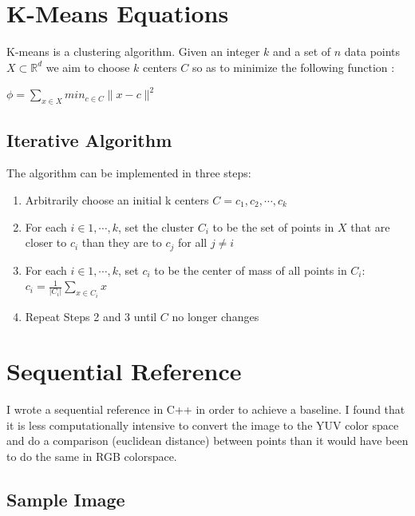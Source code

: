\documentclass[11pt]{article}
\begin{document}
\maketitle

\section{K-Means Equations}

K-means is a clustering algorithm. Given an integer $k$ and a set of $n$ data points $X \subset \mathbb{R}^d$ we aim to choose $k$ centers $C$ so as to minimize the following function \cite{arthur}:
\newline

\begin{math}
\phi = \displaystyle\sum_{x \in X} min_{c \in C }\| x - c \|^2
\end{math}

\subsection{Iterative Algorithm}
The algorithm can be implemented in three steps:

\begin{enumerate}
\item Arbitrarily choose an initial k centers $C = {c_1, c_2, \cdots, c_k}$
\item For each $i \in {1, \cdots, k}$, set the cluster $C_i$ to be the set of points in $X$ that are closer to $c_i$ than they are to $c_j$ for all $j \neq i$
\item For each $i \in {1, \cdots, k}$, set $c_i$ to be the center of mass of all points in $C_i$: $c_i = \frac{1}{|C_i|}\sum_{x \in C_i}x$
\item Repeat Steps 2 and 3 until $C$ no longer changes
\end{enumerate}

\section{Sequential Reference}

I wrote a sequential reference in C++ in order to achieve a baseline. I found that
it is less computationally intensive to convert the image to the YUV color space and
do a comparison (euclidean distance) between points than it would have been to do
the same in RGB colorspace. 

\subsection{Sample Image}
\end{document}
